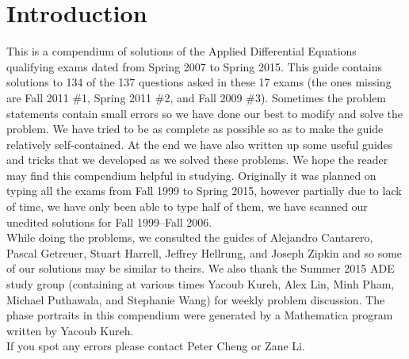 \section*{Introduction}
\noindent This is a compendium of solutions of the Applied Differential Equations
qualifying exams dated from Spring 2007 to Spring 2015. This guide
contains solutions to 134 of the 137 questions asked in these 17 exams (the ones missing are Fall 2011 \#1, Spring 2011 \#2, and Fall 2009 \#3).
Sometimes the problem statements contain small errors so we have done our best to modify and solve the problem.
We have tried to be as complete as possible
so as to make the guide relatively self-contained. At the end we have also written up some useful
guides and tricks that we developed as we solved these problems. We hope the reader may find this compendium helpful
in studying. Originally it was planned on typing all the exams from Fall 1999 to Spring 2015, however partially
due to lack of time, we have only been able to type half of them, we have scanned our unedited solutions for Fall 1999--Fall 2006.\\

\noindent While doing the problems, we consulted the guides of
Alejandro Cantarero, Pascal Getreuer, Stuart Harrell, Jeffrey Hellrung, and Joseph Zipkin and so some of
our solutions may be similar to theirs. We also thank the Summer 2015 ADE study group (containing at various
times Yacoub Kureh, Alex Lin, Minh Pham, Michael Puthawala, and Stephanie Wang) for weekly problem discussion.
The phase portraits in this compendium were generated by a Mathematica program written by Yacoub Kureh.\\

\noindent If you spot any errors please contact Peter Cheng or Zane Li.
